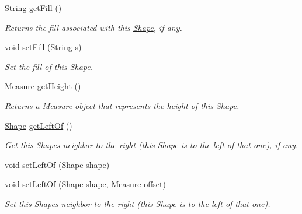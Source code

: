 \begin{DoxyCompactItemize}
String \hyperlink{classcom_1_1aarrelaakso_1_1drawl_1_1_shape_a0d9a33a3e151aaceeec140bea343a650}{get\+Fill} ()
\begin{DoxyCompactList}\small\item\em Returns the fill associated with this \hyperlink{classcom_1_1aarrelaakso_1_1drawl_1_1_shape}{Shape}, if any. \end{DoxyCompactList}\item 
void \hyperlink{classcom_1_1aarrelaakso_1_1drawl_1_1_shape_a2a2868c85bfbf4d2940d929950001b3d}{set\+Fill} (String s)
\begin{DoxyCompactList}\small\item\em Set the fill of this \hyperlink{classcom_1_1aarrelaakso_1_1drawl_1_1_shape}{Shape}. \end{DoxyCompactList}\item 
\hyperlink{classcom_1_1aarrelaakso_1_1drawl_1_1_measure}{Measure} \hyperlink{classcom_1_1aarrelaakso_1_1drawl_1_1_shape_ac9f74d31c332aab76b329edc22080e67}{get\+Height} ()
\begin{DoxyCompactList}\small\item\em Returns a \hyperlink{classcom_1_1aarrelaakso_1_1drawl_1_1_measure}{Measure} object that represents the height of this \hyperlink{classcom_1_1aarrelaakso_1_1drawl_1_1_shape}{Shape}. \end{DoxyCompactList}\item 
\hyperlink{classcom_1_1aarrelaakso_1_1drawl_1_1_shape}{Shape} \hyperlink{classcom_1_1aarrelaakso_1_1drawl_1_1_shape_a2b19d5964ac46d545a7bae3133df6532}{get\+Left\+Of} ()
\begin{DoxyCompactList}\small\item\em Get this \hyperlink{classcom_1_1aarrelaakso_1_1drawl_1_1_shape}{Shape}\textquotesingle{}s neighbor to the right (this \hyperlink{classcom_1_1aarrelaakso_1_1drawl_1_1_shape}{Shape} is to the left of that one), if any. \end{DoxyCompactList}\item 
void \hyperlink{classcom_1_1aarrelaakso_1_1drawl_1_1_shape_aad14fa860ab74cfa90815f56cf4c3ecf}{set\+Left\+Of} (\hyperlink{classcom_1_1aarrelaakso_1_1drawl_1_1_shape}{Shape} shape)
\item 
void \hyperlink{classcom_1_1aarrelaakso_1_1drawl_1_1_shape_aa1f77ee3e24986329b3618b76b2d12be}{set\+Left\+Of} (\hyperlink{classcom_1_1aarrelaakso_1_1drawl_1_1_shape}{Shape} shape, \hyperlink{classcom_1_1aarrelaakso_1_1drawl_1_1_measure}{Measure} offset)
\begin{DoxyCompactList}\small\item\em Set this \hyperlink{classcom_1_1aarrelaakso_1_1drawl_1_1_shape}{Shape}\textquotesingle{}s neighbor to the right (this \hyperlink{classcom_1_1aarrelaakso_1_1drawl_1_1_shape}{Shape} is to the left of that one). \end{DoxyCompactList}\item 

\end{DoxyCompactItemize}
